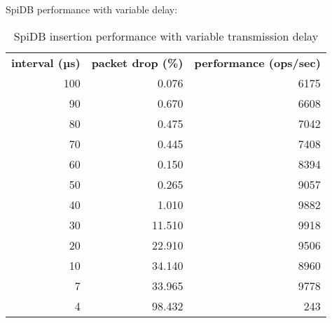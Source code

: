SpiDB performance with variable delay:

\begin{table}
\begin{tabular}{ r | r | r }
\textbf{interval (µs)} & \textbf{packet drop (\%)} & \textbf{performance (ops/sec)}  \\
100 & 0.076 	& 6175 \\
90	& 0.670		& 6608 \\
80	& 0.475		& 7042 \\
70	& 0.445		& 7408 \\
60	& 0.150		& 8394 \\
50	& 0.265		& 9057 \\
40	& 1.010		& 9882 \\
30	& 11.510	& 9918 \\
20	& 22.910	& 9506 \\ 
10	& 34.140	& 8960 \\
7	& 33.965 	& 9778 \\
4	& 98.432 	& 243 \\
\end{tabular}
\caption{SpiDB insertion performance with variable transmission delay}
\label{table:performance_delay}
\end{table}


